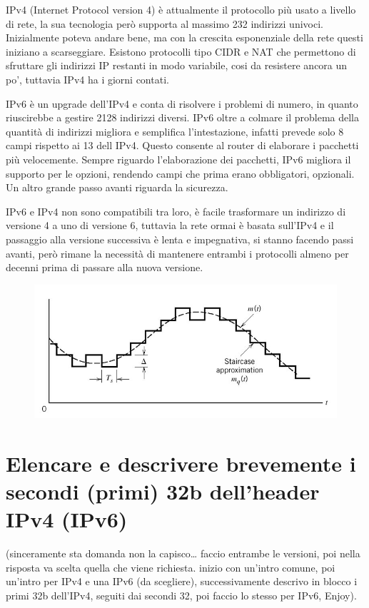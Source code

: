 IPv4 (Internet Protocol version 4) è attualmente il protocollo più usato a livello di rete, la sua tecnologia però supporta al massimo 232 indirizzi univoci.
Inizialmente poteva andare bene, ma con la crescita esponenziale della rete questi iniziano a scarseggiare. Esistono protocolli tipo CIDR e NAT che permettono di sfruttare gli indirizzi IP restanti in modo variabile, cosi da resistere ancora un po’, tuttavia IPv4 ha i giorni contati.

IPv6 è un upgrade dell’IPv4 e conta di risolvere i problemi di numero, in quanto riuscirebbe a gestire 2128 indirizzi diversi.
IPv6 oltre a colmare il problema della quantità di indirizzi migliora e semplifica l’intestazione, infatti prevede solo 8 campi rispetto ai 13 dell IPv4. Questo consente al router di elaborare i pacchetti più velocemente. Sempre riguardo l’elaborazione dei pacchetti, IPv6 migliora il supporto per le opzioni, rendendo campi che prima erano obbligatori, opzionali. Un altro grande passo avanti riguarda la sicurezza.

IPv6 e IPv4 non sono compatibili tra loro, è facile trasformare un indirizzo di versione 4 a uno di versione 6, tuttavia la rete ormai è basata sull’IPv4 e il passaggio alla versione successiva è lenta e impegnativa, si stanno facendo passi avanti, però rimane la necessità di mantenere entrambi i protocolli almeno per decenni prima di passare alla nuova versione.

\begin{figure}[H]
\centering
\includegraphics[scale=0.6]{res/img/6_modulazioneDelta.png}
\end{figure}

\section{Elencare e descrivere brevemente i secondi (primi) 32b dell'header IPv4 (IPv6)}
(sinceramente sta domanda non la capisco… faccio entrambe le versioni, poi nella risposta va scelta quella che viene richiesta. inizio con un’intro comune, poi un’intro per IPv4 e una IPv6 (da scegliere), successivamente descrivo in blocco i primi 32b dell’IPv4, seguiti dai secondi 32, poi faccio lo stesso per IPv6, Enjoy).\\


